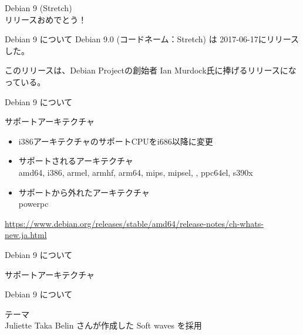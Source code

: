 \begin{frame}\begin{center}\Huge{Debian 9 (Stretch)\\リリースおめでとう！}\end{center}\end{frame}

\begin{frame}{Debian 9 について}%
  Debian 9.0 (コードネーム：Stretch) は 2017-06-17にリリースした。
  
  このリリースは、Debian Projectの創始者 Ian Murdock氏に捧げるリリースになっている。

  \begin{center}
  \end{center}
\end{frame}


\begin{frame}{Debian 9 について}%

サポートアーキテクチャ
\begin{itemize}
\item i386アーキテクチャのサポートCPUをi686以降に変更
\item サポートされるアーキテクチャ \\
  amd64, i386, armel, armhf, arm64, mips, mipsel, {\color{red}{mips64el}}, ppc64el, s390x
\item サポートから外れたアーキテクチャ \\
  powerpc
\end{itemize}

\small{\url{https://www.debian.org/releases/stable/amd64/release-notes/ch-whats-new.ja.html}}

\end{frame}


\begin{frame}{Debian 9 について}%

サポートアーキテクチャ
\begin{center}
\end{center}

\end{frame}

\begin{frame}{Debian 9 について}%

テーマ\\
Juliette Taka Belin さんが作成した Soft waves を採用
\begin{center}
\end{center}
\end{frame}


